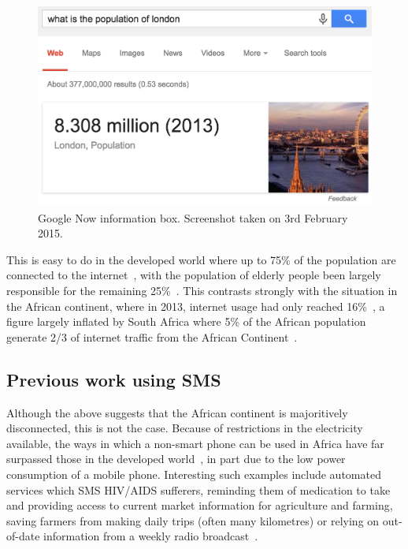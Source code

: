 \documentclass{article}
\begin{document}
\begin{figure}[htb] 
\includegraphics[width=\linewidth]{googleInstant}
\caption{Google Now information box.  Screenshot taken on 3rd February 2015.}
\label{fig:googleInstant}
\end{figure}

This is easy to do in the developed world where up to 75\% of the population are connected to the internet~\cite{ITU_Cell_Usage_2013}, with the population of elderly people been largely responsible for the remaining 25\%~\cite{Gov_Internet_Usage_UK_2014}.  This contrasts strongly with the situation in the African continent, where in 2013, internet usage had only reached 16\%~\cite{ITU_Cell_Usage_2013}, a figure largely inflated by South Africa where 5\% of the African population generate 2/3 of internet traffic from the African Continent~\cite{ITU_Cell_Usage_2013}.

\subsection{Previous work using SMS}
Although the above suggests that the African continent is majoritively disconnected, this is not the case.  Because of restrictions in the electricity available, the ways in which a non-smart phone  can be used in Africa have far surpassed those in the developed world~\cite{Fox:2011:Online}, in part due to the low power consumption of a mobile phone.  Interesting such examples include automated services which SMS HIV/AIDS  sufferers, reminding them of medication to take and providing access to current market information for agriculture and farming, saving farmers from making daily trips (often many kilometres) or relying on out-of-date information from a weekly radio broadcast~\cite{Aker_Mobile_Phones_2010}.
\end{document}
